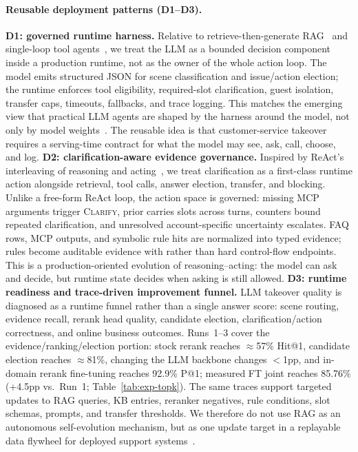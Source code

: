 \documentclass[sigconf,review]{acmart}
\newcommand{\code}[1]{\texttt{\seqsplit{#1}}}
\begin{document}
\paragraph{Reusable deployment patterns (D1--D3).}
\label{contrib:controller}
\label{contrib:ranking}
\textbf{D1: governed runtime harness.} Relative to retrieve-then-generate RAG~\cite{lewis2020rag} and single-loop tool agents~\cite{yao2023react}, we treat the LLM as a bounded decision component inside a production runtime, not as the owner of the whole action loop. The model emits structured JSON for scene classification and issue/action election; the runtime enforces tool eligibility, required-slot clarification, guest isolation, transfer caps, timeouts, fallbacks, and trace logging. This matches the emerging view that practical LLM agents are shaped by the harness around the model, not only by model weights~\cite{zhou2026externalization}. The reusable idea is that customer-service takeover requires a serving-time contract for what the model may see, ask, call, choose, and log.
\textbf{D2: clarification-aware evidence governance.} Inspired by ReAct's interleaving of reasoning and acting~\cite{yao2023react}, we treat clarification as a first-class runtime action alongside retrieval, tool calls, answer election, transfer, and blocking. Unlike a free-form ReAct loop, the action space is governed: missing MCP arguments trigger \textsc{Clarify}, prior \code{classify\_json} carries slots across turns, counters bound repeated clarification, and unresolved account-specific uncertainty escalates. FAQ rows, MCP outputs, and symbolic rule hits are normalized into typed evidence; rules become auditable \code{category=rule} evidence with \code{rule\_answer=None} rather than hard control-flow endpoints. This is a production-oriented evolution of reasoning--acting: the model can ask and decide, but runtime state decides when asking is still allowed.
\textbf{D3: runtime readiness and trace-driven improvement funnel.} LLM takeover quality is diagnosed as a runtime funnel rather than a single answer score: scene routing, evidence recall, rerank head quality, candidate election, clarification/action correctness, and online business outcomes. Runs~1--3 cover the evidence/ranking/election portion: stock rerank reaches $\approx$57\% Hit@1, candidate election reaches $\approx$81\%, changing the LLM backbone changes $<$1pp, and in-domain rerank fine-tuning reaches 92.9\% P@1; measured FT joint reaches 85.76\% (+4.5pp vs.\ Run~1; Table~\ref{tab:exp-topk}). The same traces support targeted updates to RAG queries, KB entries, reranker negatives, rule conditions, slot schemas, prompts, and transfer thresholds. We therefore do not use RAG as an autonomous self-evolution mechanism, but as one update target in a replayable data flywheel for deployed support systems~\cite{zhao2025agentloop}.
\end{document}
